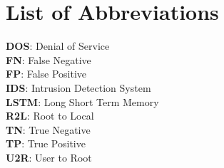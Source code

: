 

{
\KECadjusttocspacings %
\makeatletter
\def\@makeschapterhead#1{%
  {\newpage \parindent \z@ \raggedright
    \normalfont
    \interlinepenalty\@M
    \center \fontsize{16pt}{1} \bfseries \MakeUppercase{#1}\par\nobreak
  }}
\makeatother 

\tableofcontents %
\listoffigures %
}
\chapter*{List of Abbreviations}
\textbf{DOS}: Denial of Service\\
\textbf{FN}: False  Negative \\
\textbf{FP}: False Positive\\
\textbf{IDS}: Intrusion Detection System\\
\textbf{LSTM}: Long Short Term Memory\\
\textbf{R2L}: Root to Local \\
\textbf{TN}: True Negative\\
\textbf{TP}: True Positive\\
\textbf{U2R}: User to Root\\

